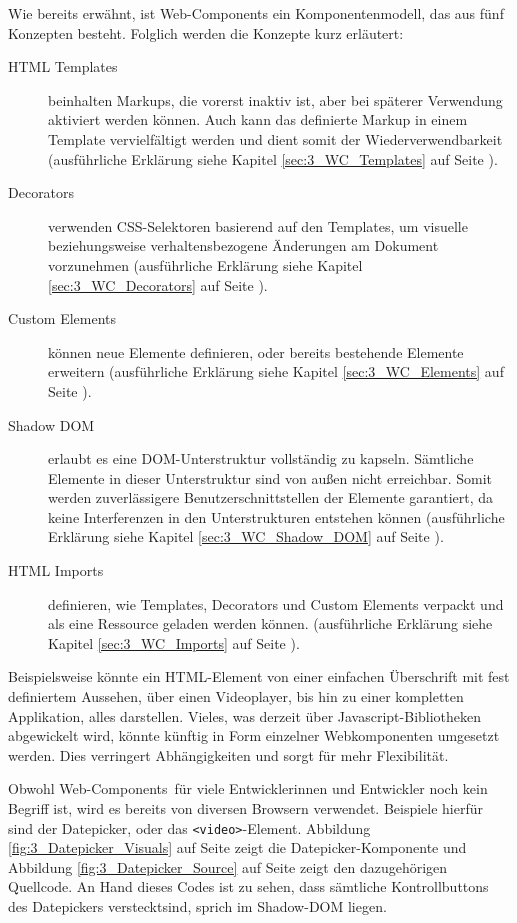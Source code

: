 Wie bereits erwähnt, ist Web-Components ein Komponentenmodell, das aus fünf Konzepten besteht. Folglich werden die Konzepte kurz erläutert:
\begin{description}
\item[HTML Templates] beinhalten Markups, die vorerst inaktiv ist, aber bei späterer Verwendung aktiviert werden können. Auch kann das definierte Markup in einem Template vervielfältigt werden und dient somit der Wiederverwendbarkeit (ausführliche Erklärung siehe Kapitel \ref{sec:3_WC_Templates} auf Seite \pageref{sec:3_WC_Templates}).
\item[Decorators] verwenden CSS-Selektoren basierend auf den Templates, um visuelle beziehungsweise verhaltensbezogene Änderungen am Dokument vorzunehmen (ausführliche Erklärung siehe Kapitel \ref{sec:3_WC_Decorators} auf Seite \pageref{sec:3_WC_Decorators}).
\item[Custom Elements] können neue Elemente definieren, oder bereits bestehende Elemente erweitern (ausführliche Erklärung siehe Kapitel \ref{sec:3_WC_Elements} auf Seite \pageref{sec:3_WC_Elements}).
\item[Shadow DOM] erlaubt es eine DOM-Unterstruktur vollständig zu kapseln. Sämtliche Elemente in dieser Unterstruktur sind von außen nicht erreichbar. Somit werden zuverlässigere Benutzerschnittstellen der Elemente garantiert, da keine Interferenzen in den Unterstrukturen entstehen können (ausführliche Erklärung siehe Kapitel \ref{sec:3_WC_Shadow_DOM} auf Seite \pageref{sec:3_WC_Shadow_DOM}).
\item[HTML Imports] definieren, wie Templates, Decorators und Custom Elements verpackt und als eine Ressource geladen werden können. (ausführliche Erklärung siehe Kapitel \ref{sec:3_WC_Imports} auf Seite \pageref{sec:3_WC_Imports}).
\end{description}

Beispielsweise könnte ein HTML-Element von einer einfachen Überschrift mit fest definiertem Aussehen, über einen Videoplayer, bis hin zu einer kompletten Applikation, alles darstellen. Vieles, was derzeit über Javascript-Bibliotheken abgewickelt wird, könnte künftig in Form einzelner Webkomponenten umgesetzt werden. Dies verringert Abhängigkeiten und sorgt für mehr Flexibilität.

Obwohl \glqq Web-Components\grqq\ für viele Entwicklerinnen und Entwickler noch kein Begriff ist, wird es bereits von diversen Browsern verwendet. Beispiele hierfür sind der \glqq Datepicker\grqq , oder das \lstinline|<video>|-Element. Abbildung \ref{fig:3_Datepicker_Visuals} auf Seite \pageref{fig:3_Datepicker_Visuals} zeigt die Datepicker-Komponente und Abbildung \ref{fig:3_Datepicker_Source} auf Seite \pageref{fig:3_Datepicker_Source} zeigt den dazugehörigen Quellcode. An Hand dieses Codes ist zu sehen, dass sämtliche Kontrollbuttons des Datepickers \glqq versteckt\grqq sind, sprich im Shadow-DOM liegen.


